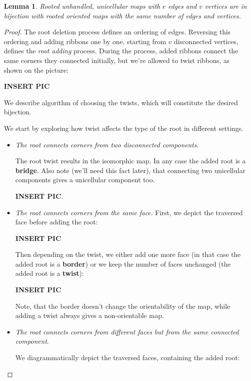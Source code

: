 \documentclass{article}
\newtheorem{lemma}{Lemma}
\begin{document}
\begin{lemma} \label{lemma:unhandled_to_oriented_bijection}
    Rooted unhandled, unicellular maps with $e$ edges and $v$ vertices are in bijection with rooted oriented maps with the same number of edges and vertices.
\end{lemma}
\begin{proof}
	The root deletion process defines an ordering of edges. Reversing this ordering and adding ribbons one by one, starting from $v$ disconnected vertices, defines the \emph{root adding} process. During the process, added ribbons connect the same corners they connected initially, but we're allowed to twist ribbons, as shown on the picture:
	
	\textbf{INSERT PIC}
	
	We describe algorithm of choosing the twists, which will constitute the desired bijection.
	
	We start by exploring how twist affects the type of the root in different settings.
	
	\begin{itemize}
		\item[\textbf{Case 1}] \emph{The root connects corners from two disconnected components}.
		
		The root twist results in the isomorphic map. In any case the added root is a \textbf{bridge}. Also note (we'll need this fact later), that connecting two unicellular components gives a unicellular component too.
		
		\textbf{INSERT PIC}.
		\item[\textbf{Case 2}] \emph{The root connects corners from the same face.}
		 First, we depict the traversed face before adding the root:
		
		\textbf{INSERT PIC}
		
		Then depending on the twist, we either add one more face (in that case the added root is a \textbf{border}) or we keep the number of faces unchanged (the added root is a \textbf{twist}):
		
		\textbf{INSERT PIC}
		
		Note, that the border doesn't change the orientability of the map, while adding a twist always gives a non-orientable map.
		
		\item[\textbf{Case 3}] \emph{The root connects corners from different faces but from the same connected component}.
		
		We diagrammatically depict the traversed faces, containing the added root:
		

\end{itemize}
\end{proof}
\end{document}
